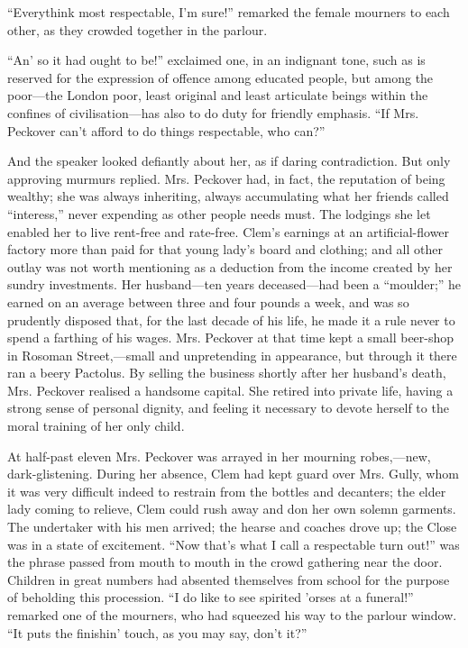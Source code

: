 ``Everythink most respectable, I'm sure!'' remarked the female mourners
to each other, as they crowded together in the parlour.

``An' so it had ought to be!'' exclaimed one, in an indignant tone, such
as is reserved for the expression of offence among educated people, but
among the poor---the London {\protect\hypertarget{99}{}{}}poor, least
original and least articulate beings within the confines of
civilisation---has also to do duty for friendly emphasis. ``If Mrs.
Peckover can't afford to do things respectable, who can?''

And the speaker looked defiantly about her, as if daring contradiction.
But only approving murmurs replied. Mrs. Peckover had, in fact, the
reputation of being wealthy; she was always inheriting, always
accumulating what her friends called ``interess,'' never expending as
other people needs must. The lodgings she let enabled her to live
rent-free and rate-free. Clem's earnings at an artificial-flower factory
more than paid for that young lady's board and clothing; and all other
outlay was not worth mentioning as a deduction from the income created
by her sundry investments. Her husband---ten years deceased---had been a
``moulder;'' he earned on an average between three and four pounds a
week, and was so prudently disposed that, for the last decade of his
life, he made it a rule never to spend a farthing of
{\protect\hypertarget{100}{}{}}his wages. Mrs. Peckover at that time
kept a small beer-shop in Rosoman Street,---small and unpretending in
appearance, but through it there ran a beery Pactolus. By selling the
business shortly after her husband's death, Mrs. Peckover realised a
handsome capital. She retired into private life, having a strong sense
of personal dignity, and feeling it necessary to devote herself to the
moral training of her only child.

At half-past eleven Mrs. Peckover was arrayed in her mourning
robes,---new, dark-glistening. During her absence, Clem had kept guard
over Mrs. Gully, whom it was very difficult indeed to restrain from the
bottles and decanters; the elder lady coming to relieve, Clem could rush
away and don her own solemn garments. The undertaker with his men
arrived; the hearse and coaches drove up; the Close was in a state of
excitement. ``Now that's what I call a respectable turn out!'' was the
phrase passed from mouth to mouth in the crowd gathering near the door.
Children in great numbers had {\protect\hypertarget{101}{}{}}absented
themselves from school for the purpose of beholding this procession. ``I
do like to see spirited 'orses at a funeral!'' remarked one of the
mourners, who had squeezed his way to the parlour window. ``It puts the
finishin' touch, as you may say, don't it?''


